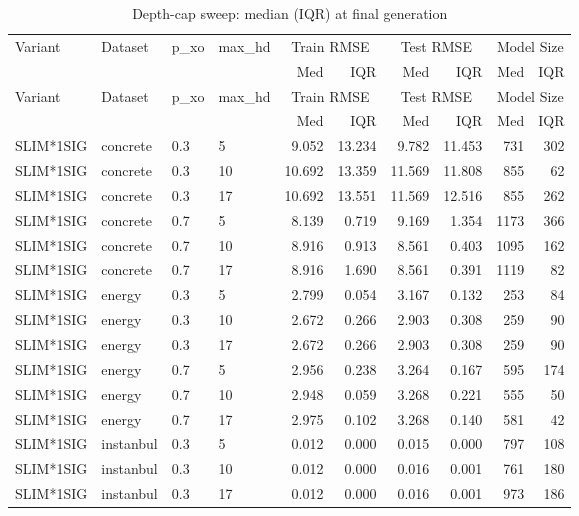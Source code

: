 \begin{longtable}{llllrrrrrr}
\caption{Depth-cap sweep: median (IQR) at final generation} \label{tab:depth_cap} \\
\toprule
Variant & Dataset & p\_xo & max\_hd & \multicolumn{2}{c}{Train RMSE} & \multicolumn{2}{c}{Test RMSE} & \multicolumn{2}{c}{Model Size} \\
\cmidrule(lr){5-6}\cmidrule(lr){7-8}\cmidrule(lr){9-10}
 & & & & Med & IQR & Med & IQR & Med & IQR \\
\midrule
\endfirsthead
\toprule
Variant & Dataset & p\_xo & max\_hd & \multicolumn{2}{c}{Train RMSE} & \multicolumn{2}{c}{Test RMSE} & \multicolumn{2}{c}{Model Size} \\
 & & & & Med & IQR & Med & IQR & Med & IQR \\
\midrule
\endhead
\bottomrule
\endfoot
SLIM*1SIG & concrete & 0.3 & 5 & 9.052 & 13.234 & 9.782 & 11.453 & 731 & 302 \\
SLIM*1SIG & concrete & 0.3 & 10 & 10.692 & 13.359 & 11.569 & 11.808 & 855 & 62 \\
SLIM*1SIG & concrete & 0.3 & 17 & 10.692 & 13.551 & 11.569 & 12.516 & 855 & 262 \\
SLIM*1SIG & concrete & 0.7 & 5 & 8.139 & 0.719 & 9.169 & 1.354 & 1173 & 366 \\
SLIM*1SIG & concrete & 0.7 & 10 & 8.916 & 0.913 & 8.561 & 0.403 & 1095 & 162 \\
SLIM*1SIG & concrete & 0.7 & 17 & 8.916 & 1.690 & 8.561 & 0.391 & 1119 & 82 \\
\midrule
SLIM*1SIG & energy & 0.3 & 5 & 2.799 & 0.054 & 3.167 & 0.132 & 253 & 84 \\
SLIM*1SIG & energy & 0.3 & 10 & 2.672 & 0.266 & 2.903 & 0.308 & 259 & 90 \\
SLIM*1SIG & energy & 0.3 & 17 & 2.672 & 0.266 & 2.903 & 0.308 & 259 & 90 \\
SLIM*1SIG & energy & 0.7 & 5 & 2.956 & 0.238 & 3.264 & 0.167 & 595 & 174 \\
SLIM*1SIG & energy & 0.7 & 10 & 2.948 & 0.059 & 3.268 & 0.221 & 555 & 50 \\
SLIM*1SIG & energy & 0.7 & 17 & 2.975 & 0.102 & 3.268 & 0.140 & 581 & 42 \\
\midrule
SLIM*1SIG & instanbul & 0.3 & 5 & 0.012 & 0.000 & 0.015 & 0.000 & 797 & 108 \\
SLIM*1SIG & instanbul & 0.3 & 10 & 0.012 & 0.000 & 0.016 & 0.001 & 761 & 180 \\
SLIM*1SIG & instanbul & 0.3 & 17 & 0.012 & 0.000 & 0.016 & 0.001 & 973 & 186 \\

\end{longtable}
